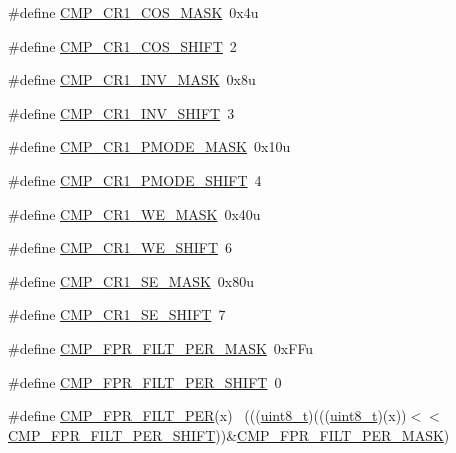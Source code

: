 \begin{DoxyCompactItemize}
\item 
\#define \hyperlink{group___c_m_p___register___masks_gaf8b38740c4bddec386b2b7d674f5f0fc}{C\+M\+P\+\_\+\+C\+R1\+\_\+\+C\+O\+S\+\_\+\+M\+A\+SK}~0x4u
\item 
\#define \hyperlink{group___c_m_p___register___masks_gaaf826df5b4ff2069e2cb112f03c7b782}{C\+M\+P\+\_\+\+C\+R1\+\_\+\+C\+O\+S\+\_\+\+S\+H\+I\+FT}~2
\item 
\#define \hyperlink{group___c_m_p___register___masks_ga562c151a4679c2b50e20d6418dcc7d99}{C\+M\+P\+\_\+\+C\+R1\+\_\+\+I\+N\+V\+\_\+\+M\+A\+SK}~0x8u
\item 
\#define \hyperlink{group___c_m_p___register___masks_gae8bcf6f11eb6afb3967dc6e318b0c41f}{C\+M\+P\+\_\+\+C\+R1\+\_\+\+I\+N\+V\+\_\+\+S\+H\+I\+FT}~3
\item 
\#define \hyperlink{group___c_m_p___register___masks_ga09a2757123048a40e1694dd9454982ee}{C\+M\+P\+\_\+\+C\+R1\+\_\+\+P\+M\+O\+D\+E\+\_\+\+M\+A\+SK}~0x10u
\item 
\#define \hyperlink{group___c_m_p___register___masks_ga35cfe45cce5ed6925e522e3c4527054a}{C\+M\+P\+\_\+\+C\+R1\+\_\+\+P\+M\+O\+D\+E\+\_\+\+S\+H\+I\+FT}~4
\item 
\#define \hyperlink{group___c_m_p___register___masks_ga70bc3069a7e105b59d01d83b4d1714b1}{C\+M\+P\+\_\+\+C\+R1\+\_\+\+W\+E\+\_\+\+M\+A\+SK}~0x40u
\item 
\#define \hyperlink{group___c_m_p___register___masks_ga386bf7ca4f7eb8faa4ba8346620667f2}{C\+M\+P\+\_\+\+C\+R1\+\_\+\+W\+E\+\_\+\+S\+H\+I\+FT}~6
\item 
\#define \hyperlink{group___c_m_p___register___masks_ga899d139651dd67746e73452ff19e892b}{C\+M\+P\+\_\+\+C\+R1\+\_\+\+S\+E\+\_\+\+M\+A\+SK}~0x80u
\item 
\#define \hyperlink{group___c_m_p___register___masks_ga57cd3f81d8844d4e0509f342ae5170bb}{C\+M\+P\+\_\+\+C\+R1\+\_\+\+S\+E\+\_\+\+S\+H\+I\+FT}~7
\item 
\#define \hyperlink{group___c_m_p___register___masks_gaf8ca758656c156ecadfbb6f9e57a3eef}{C\+M\+P\+\_\+\+F\+P\+R\+\_\+\+F\+I\+L\+T\+\_\+\+P\+E\+R\+\_\+\+M\+A\+SK}~0x\+F\+Fu
\item 
\#define \hyperlink{group___c_m_p___register___masks_gaa563be7a82c0c1e3802e7ac7c920bf3a}{C\+M\+P\+\_\+\+F\+P\+R\+\_\+\+F\+I\+L\+T\+\_\+\+P\+E\+R\+\_\+\+S\+H\+I\+FT}~0
\item 
\#define \hyperlink{group___c_m_p___register___masks_ga64552c5393c5361b4e87fae0df10308e}{C\+M\+P\+\_\+\+F\+P\+R\+\_\+\+F\+I\+L\+T\+\_\+\+P\+ER}(x)                                        ~(((\hyperlink{_p_e___types_8h_aba7bc1797add20fe3efdf37ced1182c5}{uint8\+\_\+t})(((\hyperlink{_p_e___types_8h_aba7bc1797add20fe3efdf37ced1182c5}{uint8\+\_\+t})(x))$<$$<$\hyperlink{group___c_m_p___register___masks_gaa563be7a82c0c1e3802e7ac7c920bf3a}{C\+M\+P\+\_\+\+F\+P\+R\+\_\+\+F\+I\+L\+T\+\_\+\+P\+E\+R\+\_\+\+S\+H\+I\+FT}))\&\hyperlink{group___c_m_p___register___masks_gaf8ca758656c156ecadfbb6f9e57a3eef}{C\+M\+P\+\_\+\+F\+P\+R\+\_\+\+F\+I\+L\+T\+\_\+\+P\+E\+R\+\_\+\+M\+A\+SK})
$$
\end{DoxyCompactItemize}
